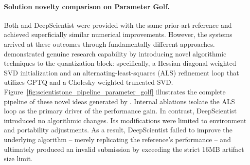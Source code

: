 \paragraph{Solution novelty comparison on Parameter Golf.}
Both \sys{} and DeepScientist were provided with the same prior-art reference and achieved superficially similar numerical improvements. 
However, the systems arrived at these outcomes through fundamentally different approaches. 
\sys{} demonstrated genuine research capability by introducing novel algorithmic techniques to the quantization block: specifically, a Hessian-diagonal-weighted SVD initialization and an alternating-least-squares (ALS) refinement loop that utilizes GPTQ and a Cholesky-weighted truncated SVD. 
Figure~\ref{fig:scientistone_pipeline_parameter_golf} illustrates the complete pipeline of these novel ideas generated by \sys{}.
Internal ablations isolate the ALS loop as the primary driver of the performance gain. 
In contrast, DeepScientist introduced no algorithmic changes.
Its modifications were limited to environment and portability adjustments. 
As a result, DeepScientist failed to improve the underlying algorithm -- merely replicating the reference's performance -- and ultimately produced an invalid submission by exceeding the strict 16MB artifact size limit. 







